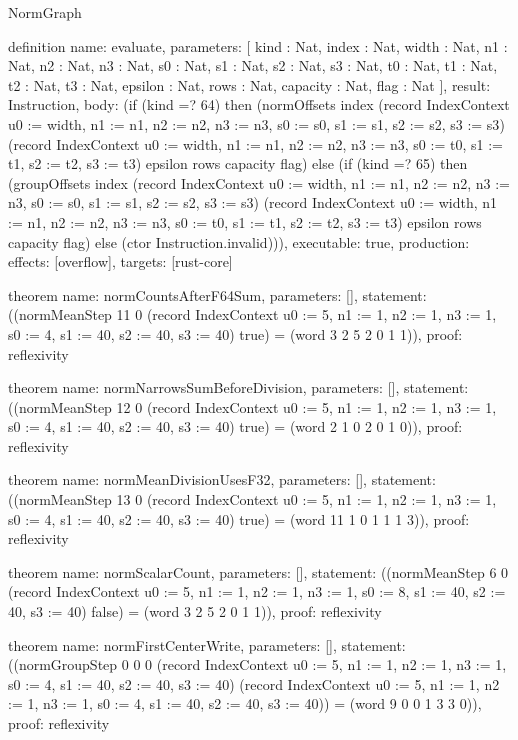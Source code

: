 \begin{lexlean}{NormGraph}
\begin{semanticmodule}
definition{
  name: evaluate,
  parameters: [
    kind : Nat,
    index : Nat,
    width : Nat,
    n1 : Nat,
    n2 : Nat,
    n3 : Nat,
    s0 : Nat,
    s1 : Nat,
    s2 : Nat,
    s3 : Nat,
    t0 : Nat,
    t1 : Nat,
    t2 : Nat,
    t3 : Nat,
    epsilon : Nat,
    rows : Nat,
    capacity : Nat,
    flag : Nat
  ],
  result: Instruction,
  body: (if (kind =? 64) then (normOffsets index (record IndexContext {u0 := width, n1 := n1, n2 := n2, n3 := n3, s0 := s0, s1 := s1, s2 := s2, s3 := s3}) (record IndexContext {u0 := width, n1 := n1, n2 := n2, n3 := n3, s0 := t0, s1 := t1, s2 := t2, s3 := t3}) epsilon rows capacity flag) else (if (kind =? 65) then (groupOffsets index (record IndexContext {u0 := width, n1 := n1, n2 := n2, n3 := n3, s0 := s0, s1 := s1, s2 := s2, s3 := s3}) (record IndexContext {u0 := width, n1 := n1, n2 := n2, n3 := n3, s0 := t0, s1 := t1, s2 := t2, s3 := t3}) epsilon rows capacity flag) else (ctor Instruction.invalid))),
  executable: true,
  production: {effects: [overflow], targets: [rust-core]}
}

theorem{
  name: normCountsAfterF64Sum,
  parameters: [],
  statement: ((normMeanStep 11 0 (record IndexContext {u0 := 5, n1 := 1, n2 := 1, n3 := 1, s0 := 4, s1 := 40, s2 := 40, s3 := 40}) true) = (word 3 2 5 2 0 1 1)),
  proof: reflexivity{}
}

theorem{
  name: normNarrowsSumBeforeDivision,
  parameters: [],
  statement: ((normMeanStep 12 0 (record IndexContext {u0 := 5, n1 := 1, n2 := 1, n3 := 1, s0 := 4, s1 := 40, s2 := 40, s3 := 40}) true) = (word 2 1 0 2 0 1 0)),
  proof: reflexivity{}
}

theorem{
  name: normMeanDivisionUsesF32,
  parameters: [],
  statement: ((normMeanStep 13 0 (record IndexContext {u0 := 5, n1 := 1, n2 := 1, n3 := 1, s0 := 4, s1 := 40, s2 := 40, s3 := 40}) true) = (word 11 1 0 1 1 1 3)),
  proof: reflexivity{}
}

theorem{
  name: normScalarCount,
  parameters: [],
  statement: ((normMeanStep 6 0 (record IndexContext {u0 := 5, n1 := 1, n2 := 1, n3 := 1, s0 := 8, s1 := 40, s2 := 40, s3 := 40}) false) = (word 3 2 5 2 0 1 1)),
  proof: reflexivity{}
}

theorem{
  name: normFirstCenterWrite,
  parameters: [],
  statement: ((normGroupStep 0 0 0 (record IndexContext {u0 := 5, n1 := 1, n2 := 1, n3 := 1, s0 := 4, s1 := 40, s2 := 40, s3 := 40}) (record IndexContext {u0 := 5, n1 := 1, n2 := 1, n3 := 1, s0 := 4, s1 := 40, s2 := 40, s3 := 40})) = (word 9 0 0 1 3 3 0)),
  proof: reflexivity{}
}


\end{semanticmodule}
\end{lexlean}
